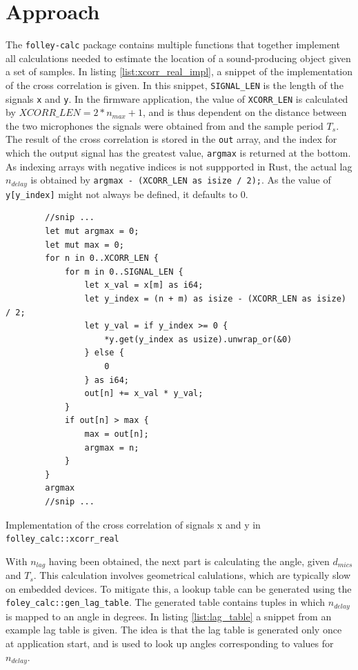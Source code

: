 \documentclass[a4paper]{article}
\newcommand{\rust}[1]{\texttt{#1}}
\begin{document}
\section{Approach}

The \texttt{folley-calc} package contains multiple functions that together implement all calculations needed to estimate the location of a sound-producing object given a set of samples. In listing \ref{list:xcorr_real_impl}, a snippet of the implementation of the cross correlation is given. In this snippet, \rust{SIGNAL_LEN} is the length of the signals \rust{x} and \rust{y}. In the firmware application, the value of \rust{XCORR_LEN} is calculated by $XCORR\_LEN = 2 * n_{max} + 1$, and is thus dependent on the distance between the two microphones the signals were obtained from and the sample period $T_s$. The result of the cross correlation is stored in the \rust{out} array, and the index for which the output signal has the greatest value, \rust{argmax} is returned at the bottom. As indexing arrays with negative indices is not suppported in Rust, the actual lag $n_{delay}$ is obtained by \rust{argmax - (XCORR_LEN as isize / 2);}. As the value of \rust{y[y_index]} might not always be defined, it defaults to $0$.

\begin{listing}[H]
    \begin{verbatim}
        //snip ...
        let mut argmax = 0;
        let mut max = 0;
        for n in 0..XCORR_LEN {
            for m in 0..SIGNAL_LEN {
                let x_val = x[m] as i64;
                let y_index = (n + m) as isize - (XCORR_LEN as isize) / 2;
                let y_val = if y_index >= 0 {
                    *y.get(y_index as usize).unwrap_or(&0)
                } else {
                    0
                } as i64;
                out[n] += x_val * y_val;
            }
            if out[n] > max {
                max = out[n];
                argmax = n;
            }
        }
        argmax
        //snip ...
    \end{verbatim}
    \caption{Implementation of the cross correlation of signals x and y in \rust{folley_calc::xcorr_real}}
    \label{list:xcorr_real_impl}
\end{listing}

With $n_{lag}$ having been obtained, the next part is calculating the angle, given $d_{mics}$ and $T_s$. This calculation involves geometrical calulations, which are typically slow on embedded devices. To mitigate this, a lookup table can be generated using the \rust{foley_calc::gen_lag_table}. The generated table contains tuples in which $n_{delay}$ is mapped to an angle in degrees. In listing \ref{list:lag_table} a snippet from an example lag table is given. The idea is that the lag table is generated only once at application start, and is used to look up angles corresponding to values for $n_{delay}$.
\end{document}
